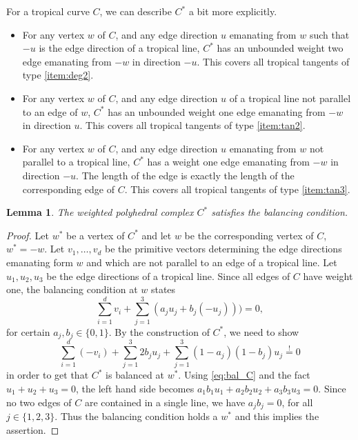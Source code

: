 \documentclass[oneside]{amsart}
\newtheorem{lemma}[thm]{Lemma}
\theoremstyle{definition}
\newcommand{\nathan}[1]{\textcolor{red}{#1}}
\newcommand{\bernd}[1]{\textcolor{green!60!black}{#1}}
\begin{document}
For a tropical curve $C$, we can describe $C^*$ a bit more explicitly.
\begin{itemize}
\item For any vertex $w$ of $C$, and any edge direction $u$ emanating from $w$ such that $-u$ is the edge direction of a tropical line, $C^*$ has an unbounded weight two edge emanating from $-w$ in direction $-u$. This covers all tropical tangents of type \ref{item:deg2}. 
\item For any vertex $w$ of $C$, and any edge direction $u$ of a tropical line not parallel to an edge of $w$, $C^*$ has an unbounded weight one edge emanating from $-w$ in direction $u$. This covers all tropical tangents of type \ref{item:tan2}.
\item For any vertex $w$ of $C$, and any edge direction $u$ emanating from $w$ not parallel to a tropical line, $C^*$ has a weight one edge emanating from $-w$ in direction $-u$. The length of the edge is exactly the length of the corresponding edge of $C$. This covers all tropical tangents of type \ref{item:tan3}.
\end{itemize}
\begin{lemma}
The weighted polyhedral complex $C^*$ satisfies the balancing condition.
\end{lemma}
\begin{proof}
\bernd{Let $ w^* $ be a vertex of $ C^* $ and 
let $ w $ be the corresponding vertex of $ C $, $ w^* = - w $.
Let $ v_1, \ldots, v_d $ be the primitive vectors determining the edge directions emanating form $ w $ and 
which are not parallel to an edge of a tropical line.
Let $ u_1, u_2, u_3 $
be the edge directions of a tropical line.
Since all edges of $ C $ have weight one,
the balancing condition at $ w $ states
\begin{equation}
\label{eq:bal_C}
	\sum_{i=1}^d v_i + \sum_{j=1}^3 (a_j u_j + b_j (-u_j)) ) = 0,
\end{equation}
for certain $ a_j, b_j \in \{ 0 ,1 \} $.
By the construction of $ C^* $, we need to show
$$
	\sum_{i=1}^d (-v_i) + \sum_{j=1}^3 2b_j u_j + \sum_{j=1}^3 (1-a_j)(1-b_j) u_j \stackrel{!}{=} 0
$$
in order to get that $ C^* $ is balanced at $ w^* $.
Using \eqref{eq:bal_C} and the fact $ u_1 + u_2 + u_3 = 0 $, 
the left hand side becomes $ a_1 b_1 u_1 + a_2 b_2 u_2 + a_3 b_3 u_3 = 0 $.
Since no two edges of $ C $ are contained in a single line, we have $ a_j b_j = 0 $, for all $ j \in \{ 1,2,3\} $.
Thus the balancing condition holds a $ w^* $ and this implies the assertion.}
\end{proof}
\end{document}

